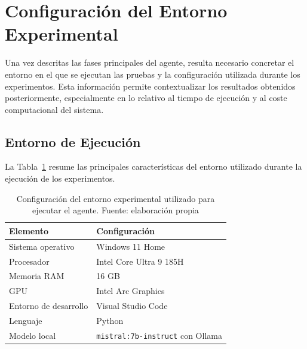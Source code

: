 \documentclass[12pt,a4paper,twoside,openright]{book}
\begin{document}
\section{Configuración del Entorno Experimental}

Una vez descritas las fases principales del agente, resulta necesario concretar el entorno en el que se ejecutan las pruebas y la configuración utilizada durante los experimentos.
Esta información permite contextualizar los resultados obtenidos posteriormente, especialmente en lo relativo al tiempo de ejecución y al coste computacional del sistema.


\subsection{Entorno de Ejecución}

La Tabla~\ref{tab:entornoExperimental} resume las principales características del entorno utilizado durante la ejecución de los experimentos.

\begin{table}[h]
    \centering
    \begin{tabular}{|l|l|}
        \hline
        \textbf{Elemento} & \textbf{Configuración} \\
        \hline
        Sistema operativo & Windows 11 Home \\
        \hline
        Procesador & Intel Core Ultra 9 185H \\
        \hline
        Memoria RAM & 16 GB \\
        \hline
        GPU & Intel Arc Graphics \\
        \hline
        Entorno de desarrollo & Visual Studio Code \\
        \hline
        Lenguaje & Python \\
        \hline
        Modelo local & \texttt{mistral:7b-instruct} con Ollama \\
        \hline
    \end{tabular}
    \caption{Configuración del entorno experimental utilizado para ejecutar el agente. Fuente: elaboración propia}
    \label{tab:entornoExperimental}
\end{table}
\end{document}
